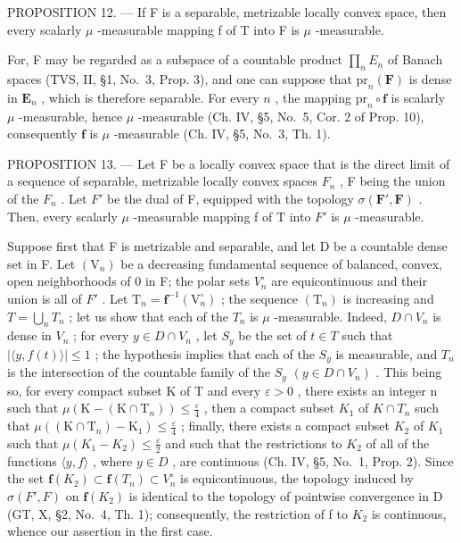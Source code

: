 PROPOSITION 12. --- If F is a separable, metrizable locally convex space, then every scalarly \(\mu\) -measurable mapping f of T into F is \(\mu\) -measurable.

For, F may be regarded as a subspace of a countable product \(\prod_{n}E_{n}\) of Banach spaces (TVS, II, §1, No.~3, Prop. 3), and one can suppose that \(\mathrm{pr}_n(\mathbf{F})\) is dense in \(\mathbf{E}_n\) , which is therefore separable. For every \(n\) , the mapping \(\mathrm{pr}_n \circ \mathbf{f}\) is scalarly \(\mu\) -measurable, hence \(\mu\) -measurable (Ch. IV, §5, No.~5, Cor. 2 of Prop. 10), consequently \(\mathbf{f}\) is \(\mu\) -measurable (Ch. IV, §5, No.~3, Th. 1).

PROPOSITION 13. --- Let F be a locally convex space that is the direct limit of a sequence of separable, metrizable locally convex spaces \(F_{n}\) , F being the union of the \(F_{n}\) . Let \(F'\) be the dual of F, equipped with the topology \(\sigma(\mathbf{F}',\mathbf{F})\) . Then, every scalarly \(\mu\) -measurable mapping f of T into \(F'\) is \(\mu\) -measurable.

Suppose first that F is metrizable and separable, and let D be a countable dense set in F. Let \((\mathrm{V}_{n})\) be a decreasing fundamental sequence of balanced, convex, open neighborhoods of 0 in F; the polar sets \(V_{n}^{\circ}\) are equicontinuous and their union is all of \(F'\) . Let \(\mathrm{T}_{n} = \mathbf{f}^{-1}(\mathrm{V}_{n}^{\circ})\) ; the sequence \((\mathrm{T}_{n})\) is increasing and \(T = \bigcup_{n} T_{n}\) ; let us show that each of the \(T_{n}\) is \(\mu\) -measurable. Indeed, \(D \cap V_{n}\) is dense in \(V_{n}\) ; for every \(y \in D \cap V_{n}\) , let \(S_{y}\) be the set of \(t \in T\) such that \(|\langle y, f(t) \rangle| \leqslant 1\) ; the hypothesis implies that each of the \(S_{y}\) is measurable, and \(T_{n}\) is the intersection of the countable family of the \(S_{y}\) \((y \in D \cap V_{n})\) . This being so, for every compact subset K of T and every \(\varepsilon > 0\) , there exists an integer n such that \(\mu\left(\mathrm{K}-\left(\mathrm{K}\cap\mathrm{T}_{n}\right)\right)\leqslant\frac{\varepsilon}{4}\) , then a compact subset \(K_{1}\) of \(K\cap T_{n}\) such that \(\mu\left(\left(\mathrm{K}\cap\mathrm{T}_{n}\right)-\mathrm{K}_{1}\right)\leqslant\frac{\varepsilon}{4}\) ; finally, there exists a compact subset \(K_{2}\) of \(K_{1}\) such that \(\mu(K_{1}-K_{2})\leqslant\frac{\varepsilon}{2}\) and such that the restrictions to \(K_{2}\) of all of the functions \(\langle y,f\rangle\) , where \(y\in D\) , are continuous (Ch. IV, §5, No.~1, Prop. 2). Since the set \(\mathbf{f}(K_{2})\subset\mathbf{f}(T_{n})\subset V_{n}^{\circ}\) is equicontinuous, the topology induced by \(\sigma(F',F)\) on \(\mathbf{f}(K_{2})\) is identical to the topology of pointwise convergence in D (GT, X, §2, No.~4, Th. 1); consequently, the restriction of f to \(K_{2}\) is continuous, whence our assertion in the first case.

